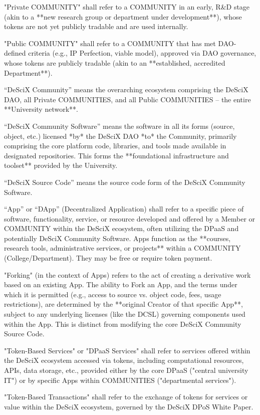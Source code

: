 \documentclass{article}
\begin{document}
"Private COMMUNITY" shall refer to a COMMUNITY in an early, R\&D stage (akin to a **new research group or department under development**), whose tokens are not yet publicly tradable and are used internally.

"Public COMMUNITY" shall refer to a COMMUNITY that has met DAO-defined criteria (e.g., IP Perfection, viable model), approved via DAO governance, whose tokens are publicly tradable (akin to an **established, accredited Department**).

“DeSciX Community” means the overarching ecosystem comprising the DeSciX DAO, all Private COMMUNITIES, and all Public COMMUNITIES – the entire **University network**.

“DeSciX Community Software” means the software in all its forms (source, object, etc.) licensed *by* the DeSciX DAO *to* the Community, primarily comprising the core platform code, libraries, and tools made available in designated repositories. This forms the **foundational infrastructure and toolset** provided by the University.

“DeSciX Source Code” means the source code form of the DeSciX Community Software.

“App” or “DApp” (Decentralized Application) shall refer to a specific piece of software, functionality, service, or resource developed and offered by a Member or COMMUNITY within the DeSciX ecosystem, often utilizing the DPaaS and potentially DeSciX Community Software. Apps function as the **courses, research tools, administrative services, or projects** within a COMMUNITY (College/Department). They may be free or require token payment.

"Forking" (in the context of Apps) refers to the act of creating a derivative work based on an existing App. The ability to Fork an App, and the terms under which it is permitted (e.g., access to source vs. object code, fees, usage restrictions), are determined by the **original Creator of that specific App**, subject to any underlying licenses (like the DCSL) governing components used within the App. This is distinct from modifying the core DeSciX Community Source Code.

"Token-Based Services" or "DPaaS Services" shall refer to services offered within the DeSciX ecosystem accessed via tokens, including computational resources, APIs, data storage, etc., provided either by the core DPaaS ("central university IT") or by specific Apps within COMMUNITIES ("departmental services").

"Token-Based Transactions" shall refer to the exchange of tokens for services or value within the DeSciX ecosystem, governed by the DeSciX DPoS White Paper.
\end{document}
